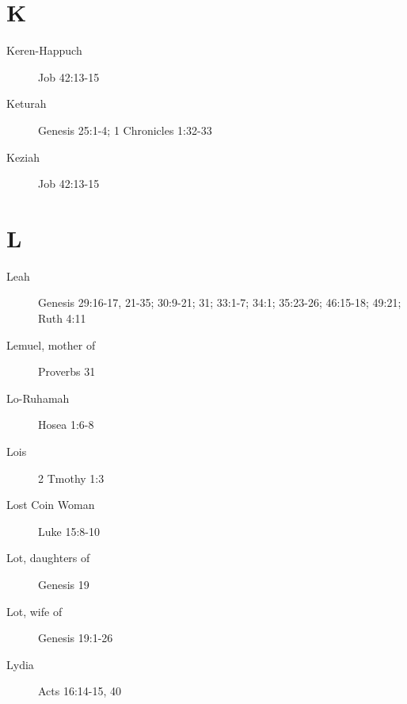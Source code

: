 \documentclass[12pt,letter,twoside,openany]{extbook}
\begin{document}
\chapter*{K}
\begin{description}
	\item [Keren-Happuch] Job 42:13-15
	\item [Keturah] Genesis 25:1-4; 1 Chronicles 1:32-33
	\item [Keziah] Job 42:13-15
\end{description}


\chapter*{L}
\begin{description}
	\item [Leah] Genesis 29:16-17, 21-35; 30:9-21; 31; 33:1-7; 34:1; 35:23-26; 46:15-18; 49:21; Ruth 4:11
	\item [Lemuel, mother of] Proverbs 31
	\item [Lo-Ruhamah] Hosea 1:6-8
	\item [Lois] 2 Tmothy 1:3
	\item [Lost Coin Woman] Luke 15:8-10
	\item [Lot, daughters of] Genesis 19
	\item [Lot, wife of] Genesis 19:1-26
	\item [Lydia] Acts 16:14-15, 40
\end{description}
\end{document}
